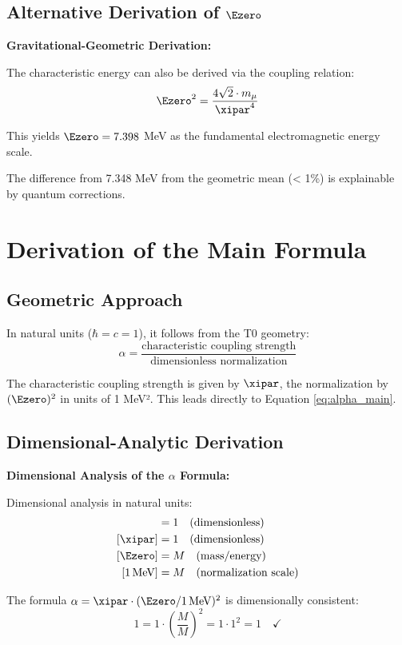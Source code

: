 	\subsection{Alternative Derivation of $\Ezero$}
	
	\begin{alternative}
		\textbf{Gravitational-Geometric Derivation:}
		
		The characteristic energy can also be derived via the coupling relation:
		\begin{equation}
			\Ezero^2 = \frac{4\sqrt{2} \cdot m_\mu}{\xipar^4}
		\end{equation}
		
		This yields $\Ezero = 7.398$ MeV as the fundamental electromagnetic energy scale.
		
		The difference from 7.348 MeV from the geometric mean (< 1\%) is explainable by quantum corrections.
	\end{alternative}
	
	\section{Derivation of the Main Formula}
	
	\subsection{Geometric Approach}
	
	In natural units ($\hbar = c = 1$), it follows from the T0 geometry:
	\begin{equation}
		\alpha = \frac{\text{characteristic coupling strength}}{\text{dimensionless normalization}}
		\label{eq:alpha_geometric}
	\end{equation}
	
	The characteristic coupling strength is given by $\xipar$, the normalization by $(\Ezero)^2$ in units of 1 MeV². This leads directly to Equation \eqref{eq:alpha_main}.
	
	\subsection{Dimensional-Analytic Derivation}
	
	\begin{foundation}
		\textbf{Dimensional Analysis of the $\alpha$ Formula:}
		
		Dimensional analysis in natural units:
		\begin{align}
			[\alpha] &= 1 \quad \text{(dimensionless)}\\
			[\xipar] &= 1 \quad \text{(dimensionless)}\\
			[\Ezero] &= M \quad \text{(mass/energy)}\\
			[1\,\text{MeV}] &= M \quad \text{(normalization scale)}
		\end{align}
		
		The formula $\alpha = \xipar \cdot (\Ezero/1\,\text{MeV})^2$ is dimensionally consistent:
		\begin{equation}
			1 = 1 \cdot \left(\frac{M}{M}\right)^2 = 1 \cdot 1^2 = 1 \quad \checkmark
		\end{equation}
	\end{foundation}
	

